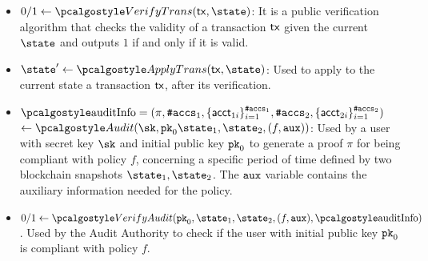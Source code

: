 \begin{itemize}
    \item $0/1 \gets \vertxn(\txn, \state)$: 
    It is a public verification algorithm that checks the validity of a transaction $\textup{\textsf{tx}}$ given the current $\state$ and outputs $1$ if and only if it is valid. 
    
    \item $\state' \gets \applytxn (\txn, \state)$:
        Used to apply to the current state a transaction $\textup{\textsf{tx}}$, after its verification.
    
    \item $\auditinfo = (\pi, {\numaccs}_1, \{ \acct_{1i} \}_{i=1}^{\numaccs_1}, {\numaccs}_2, \{ \acct_{2i} \}_{i=1}^{\numaccs_2})$ \\ $\gets \audit(\sk,\inpk \snap_{1}, \snap_{2}, (f, \aux))$: 
        Used by a user with secret key $\sk$ and initial public key $\textup{\texttt{pk}}_{0}$ to generate a proof $\pi$ for being compliant with policy $f$, concerning a specific period of time defined by two blockchain snapshots $\snap_1, \snap_2$. 
        The ${\textup{\texttt{aux}}}$ variable contains the auxiliary information needed for the policy. 
    
    \item $0/1 \gets \vera(\inpk, \snap_1, \snap_2, (f,\aux), \auditinfo)$. 
        Used by the Audit Authority to check if the user with initial public key $\textup{\texttt{pk}}_{0}$ is compliant with policy $f$.

\end{itemize}